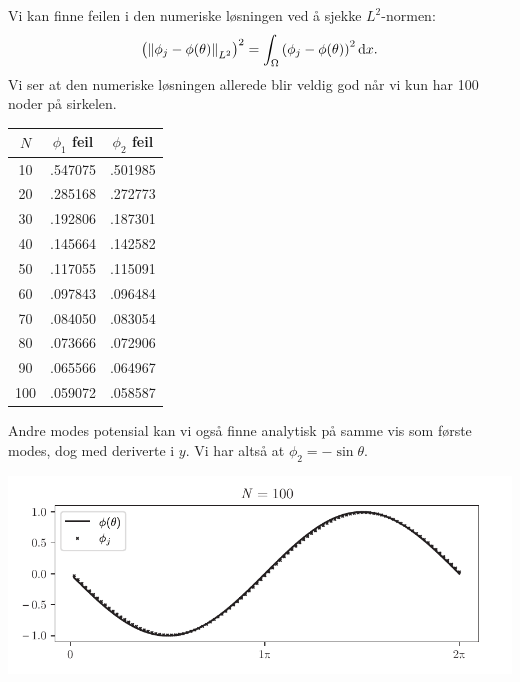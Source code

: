Vi kan finne feilen i den numeriske løsningen ved å sjekke $L^2$-normen:
\[
    {\left( {\Vert \phi_j - \phi(\theta) \Vert}_{L^2} \right)}^2 = \int_{\Omega} {\left( \phi_j - \phi(\theta) \right)}^2 \,\mathrm{d} x.
\]
Vi ser at den numeriske løsningen allerede blir veldig god når vi kun har 100 noder på sirkelen.
\begin{center}
\begin{tabular}{|c|c|c|}
    \hline
    $N$ & $\phi_1$ feil & $\phi_2$ feil\\\hline
    10 & .547075 & .501985\\\hline
    20 & .285168 & .272773\\\hline
    30 & .192806 & .187301\\\hline
    40 & .145664 & .142582\\\hline
    50 & .117055 & .115091\\\hline
    60 & .097843 & .096484\\\hline
    70 & .084050 & .083054\\\hline
    80 & .073666 & .072906\\\hline
    90 & .065566 & .064967\\\hline
    100 & .059072 & .058587\\\hline
\end{tabular}
\end{center}

\noindent Andre modes potensial kan vi også finne analytisk på samme vis som første modes, dog med deriverte i $y$.
Vi har altså at $\phi_2 = -\sin{\theta}$.
\begin{Figure}
    \centering
    \captionsetup{type = figure}
    \includegraphics[width = \textwidth]{phi2_N100.pdf}
    \label{fig:phi2_N100}
\end{Figure}

